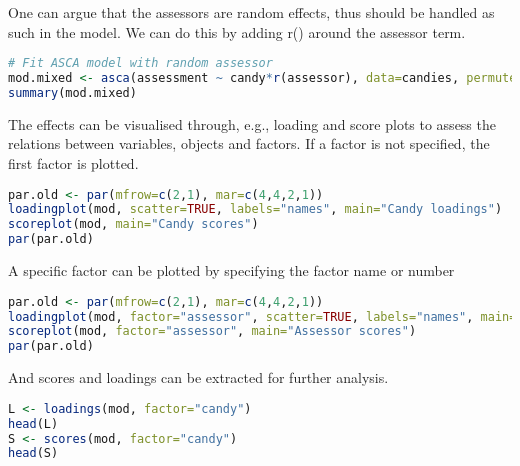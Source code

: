 \label{random-effects}

One can argue that the assessors are random effects, thus should be
handled as such in the model. We can do this by adding r() around the
assessor term.

\begin{lstlisting}[language=R, columns=fullflexible, basicstyle=\linespread{0.85}\small\ttfamily, stringstyle=\color{DarkGreen}, keywordstyle=\color{blue}, commentstyle=\color{DarkGreen},]
# Fit ASCA model with random assessor
mod.mixed <- asca(assessment ~ candy*r(assessor), data=candies, permute=TRUE)
summary(mod.mixed)
\end{lstlisting}

\label{scores-and-loadings}

The effects can be visualised through, e.g., loading and score plots to
assess the relations between variables, objects and factors. If a factor
is not specified, the first factor is plotted.

\begin{lstlisting}[language=R, columns=fullflexible, basicstyle=\linespread{0.85}\small\ttfamily, stringstyle=\color{DarkGreen}, keywordstyle=\color{blue}, commentstyle=\color{DarkGreen},]
par.old <- par(mfrow=c(2,1), mar=c(4,4,2,1))
loadingplot(mod, scatter=TRUE, labels="names", main="Candy loadings")
scoreplot(mod, main="Candy scores")
par(par.old)
\end{lstlisting}

A specific factor can be plotted by specifying the factor name or number

\begin{lstlisting}[language=R, columns=fullflexible, basicstyle=\linespread{0.85}\small\ttfamily, stringstyle=\color{DarkGreen}, keywordstyle=\color{blue}, commentstyle=\color{DarkGreen},]
par.old <- par(mfrow=c(2,1), mar=c(4,4,2,1))
loadingplot(mod, factor="assessor", scatter=TRUE, labels="names", main="Assessor loadings")
scoreplot(mod, factor="assessor", main="Assessor scores")
par(par.old)
\end{lstlisting}

And scores and loadings can be extracted for further analysis.

\begin{lstlisting}[language=R, columns=fullflexible, basicstyle=\linespread{0.85}\small\ttfamily, stringstyle=\color{DarkGreen}, keywordstyle=\color{blue}, commentstyle=\color{DarkGreen},]
L <- loadings(mod, factor="candy")
head(L)
S <- scores(mod, factor="candy")
head(S)
\end{lstlisting}


